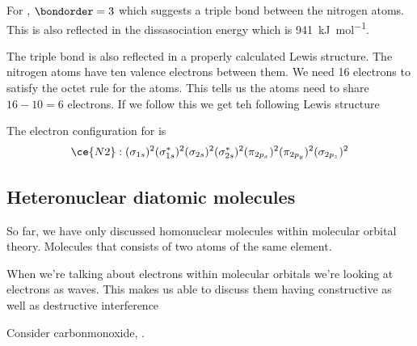 \documentclass[../mit-general-chemistry.tex]{subfiles}
\begin{document}
For , $\bondorder = 3$ which suggests a triple bond between the
nitrogen atoms. This is also reflected in the dissasociation energy
which is \SI{941}{\kilo\joule\per\mol}.

The triple bond is also reflected in a properly calculated Lewis
structure. The nitrogen atoms have ten valence electrons between
them. We need 16 electrons to satisfy the octet rule for the
atoms. This tells us the atoms need to share $16 - 10 = 6$
electrons. If we follow this we get teh following Lewis structure

\begin{center}
\end{center}

The electron configuration for  is
\begin{equation*}
  \ce{N2}:
  (\sigma_{1s})^2
  (\sigma^*_{1s})^2
  (\sigma_{2s})^2
  (\sigma^*_{2s})^2
  (\pi_{2p_x})^2
  (\pi_{2p_y})^2
  (\sigma_{2p_z})^2
\end{equation*}




\subsection{Heteronuclear diatomic molecules}

So far, we have only discussed homonuclear molecules within molecular
orbital theory. Molecules that consists of two atoms of the same
element.

When we're talking about electrons within molecular orbitals we're
looking at electrons as waves. This makes us able to discuss them
having constructive as well as destructive interference






Consider carbonmonoxide, .
\end{document}

